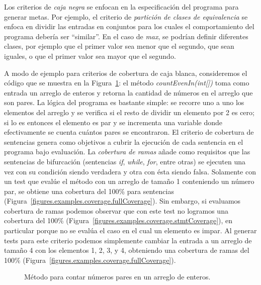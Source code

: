 Los criterios de \emph{caja negra} se enfocan en la especificaci\'on del programa para generar metas. Por ejemplo, el criterio de \emph{partici\'on de clases de equivalencia} se enfoca en dividir las entradas en conjuntos para los cuales el comportamiento del programa deber\'ia ser ``similar''. En el caso de \emph{max}, se podr\'ian definir diferentes clases, por ejemplo que el primer valor sea menor que el segundo, que sean iguales, o que el primer valor sea mayor que el segundo. 

A modo de ejemplo para criterios de cobertura de caja blanca, consideremos el c\'odigo que se muestra en la Figura~\ref{figures.code.coverageExample}: el m\'etodo \emph{countEvenIn(int[])} toma como entrada un arreglo de enteros y retorna la cantidad de n\'umeros en el arreglo que son pares. La l\'ogica del programa es bastante simple: se recorre uno a uno los elementos del arreglo y se verifica si el resto de dividir un elemento por 2 es cero; si lo es entonces el elemento es par y se incrementa una variable donde efectivamente se cuenta cu\'antos pares se encontraron. El criterio de cobertura de sentencias genera como objetivos a cubrir la ejecuci\'on de cada sentencia en el programa bajo evaluaci\'on. La \emph{cobertura de ramas} a\~nade como requisitos que las sentencias de bifurcaci\'on (sentencias \emph{if}, \emph{while}, \emph{for}, entre otras) se ejecuten una vez con su condici\'on siendo verdadera y otra con \'esta siendo falsa. Solamente con un test que eval\'ue el m\'etodo con un arreglo de tama\~no 1 conteniendo un n\'umero par, se obtiene una cobertura del 100\% para sentencias (Figura~\ref{figures.examples.coverage.fullCoverage}). Sin embargo, si evaluamos cobertura de ramas podemos observar que con este test no logramos una cobertura del 100\% (Figura~\ref{figures.examples.coverage.stmtCoverage}), en particular porque no se eval\'ua el caso en el cual un elemento es impar. Al generar tests para este criterio podemos simplemente cambiar la entrada a un arreglo de tama\~no 4 con los elementos 1, 2, 3, y 4, obteniendo una cobertura de ramas del 100\% (Figura~\ref{figures.examples.coverage.fullCoverage}).

\begin{figure}
	
	\caption{M\'etodo para contar n\'umeros pares en un arreglo de enteros.}
	\label{figures.code.coverageExample}
\end{figure}

